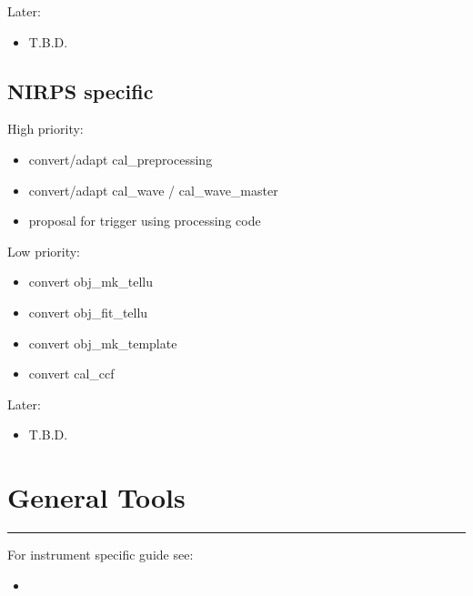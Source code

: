 \documentclass[a4paper,10pt,english]{report}
\begin{document}
Later:
\begin{itemize}
\item {} 
T.B.D.

\end{itemize}


\subsection{NIRPS specific}
\label{\detokenize{user/general/todo:nirps-specific}}
High priority:
\begin{itemize}
\item {} 
convert/adapt cal\_preprocessing

\item {} 
convert/adapt cal\_wave / cal\_wave\_master

\item {} 
proposal for trigger using processing code

\end{itemize}

Low priority:
\begin{itemize}
\item {} 
convert obj\_mk\_tellu

\item {} 
convert obj\_fit\_tellu

\item {} 
convert obj\_mk\_template

\item {} 
convert cal\_ccf

\end{itemize}

Later:
\begin{itemize}
\item {} 
T.B.D.

\end{itemize}


\section{General Tools}
\label{\detokenize{user/general/tools_default:general-tools}}\label{\detokenize{user/general/tools_default:tools-default}}\label{\detokenize{user/general/tools_default::doc}}

\bigskip\hrule\bigskip


For instrument specific guide see:
\begin{itemize}
\item {} 
{\hyperref[\detokenize{user/spirou:spirou-main}]{}}

\end{itemize}
\end{document}

